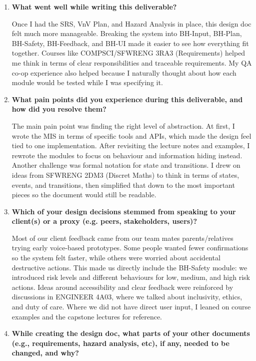 \documentclass[12pt, titlepage]{article}
\begin{document}
\begin{enumerate}

\item \textbf{What went well while writing this deliverable?}

Once I had the SRS, VnV Plan, and Hazard Analysis in place, this
design doc felt much more manageable. Breaking the system into
BH-Input, BH-Plan, BH-Safety, BH-Feedback, and BH-UI made it easier
to see how everything fit together. Courses like COMPSCI/SFWRENG
3RA3 (Requirements) helped me think in terms of clear responsibilities
and traceable requirements. My QA co-op experience also helped because
I naturally thought about how each module would be tested while I was
specifying it.

\item \textbf{What pain points did you experience during this deliverable,
and how did you resolve them?}

The main pain point was finding the right level of abstraction. At
first, I wrote the MIS in terms of specific tools and APIs, which
made the design feel tied to one implementation. After revisiting
the lecture notes and examples, I rewrote the modules to focus on
behaviour and information hiding instead. Another challenge was
formal notation for state and transitions. I drew on ideas from
SFWRENG 2DM3 (Discret Maths) to think in terms of states, events,
and transitions, then simplified that down to the most important
pieces so the document would still be readable.

\item \textbf{Which of your design decisions stemmed from speaking to your
client(s) or a proxy (e.g. peers, stakeholders, users)?}

Most of our client feedback came from our team mates parents/relatives
trying early voice-based prototypes. Some people wanted fewer confirmations
so the system felt faster, while others were worried about accidental
destructive actions. This made us directly include the BH-Safety
module: we introduced risk levels and different behaviours for low,
medium, and high risk actions. Ideas around accessibility and clear
feedback were reinforced by discussions in ENGINEER 4A03, where we talked
about inclusivity, ethics, and duty of care. Where we did not have direct
user input, I leaned on course examples and the capstone lectures for
reference.

\item \textbf{While creating the design doc, what parts of your other
documents (e.g., requirements, hazard analysis, etc), if any, needed
to be changed, and why?}


\end{enumerate}
\end{document}
